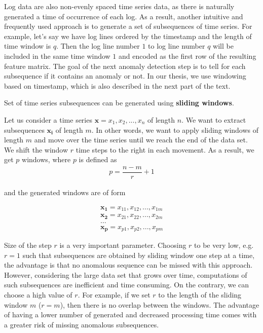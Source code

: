 Log data are also non-evenly spaced time series data, as there is naturally generated a time of occurrence of each log. As a result, another intuitive and frequently used approach is to generate a set of subsequences of time series. For example, let's say we have log lines ordered by the timestamp and the length of time window is $q$. Then the log line number $1$ to log line number $q$ will be included in the same time window $1$ and encoded as the first row of the resulting feature matrix. The goal of the next anomaly detection step is to tell for each subsequence if it contains an anomaly or not. In our thesis, we use windowing based on timestamp, which is also described in the next part of the text.    

Set of time series subsequences can be generated using \textbf{sliding windows}.

Let us consider a time series $\mathbf{x} = x_1, x_2, ..., x_n$ of length $n$. We want to extract subsequences $\mathbf{x_i}$ of length $m$. In other words, we want to apply sliding windows of length $m$ and move over the time series until we reach the end of the data set. We shift the window $r$ time steps to the right in each movement. As a result, we get $p$ windows, where $p$ is defined as 
    \begin{gather*}
        p = \dfrac{n - m}{r} + 1
    \end{gather*}

and the generated windows are of form 

\begin{gather*}
    \mathbf{x_1} = x_{11}, x_{12},..., x_{1m} \\
    \mathbf{x_2} = x_{21}, x_{22},..., x_{2m} \\
    \ldots\\
    \mathbf{x_p} = x_{p1}, x_{p2},..., x_{pm} 
\end{gather*}

Size of the step $r$ is a very important parameter. Choosing $r$ to be very low, e.g. $r = 1$ such that subsequences are obtained by sliding window one step at a time, the advantage is that no anomalous sequence can be missed with this approach. However, considering the large data set that grows over time, computations of such subsequences are inefficient and time consuming. On the contrary, we can choose a high value of $r$. For example, if we set $r$ to the length of the sliding window $m$ ($r = m$), then there is no overlap between the windows. The advantage of having a lower number of generated and decreased processing time comes with a greater risk of missing anomalous subsequences. 


